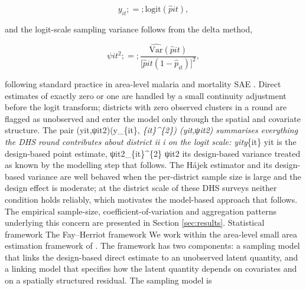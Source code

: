 \documentclass{article}
\begin{document}
\begin{equation}

y_{it} ;=; \mathrm{logit}(\hat{p}{it}),

\label{eq:logit}

\end{equation}

and the logit-scale sampling variance follows from the delta method,

\begin{equation}

\psi{it}^{2} ;=; \frac{\widehat{\mathrm{Var}}(\hat{p}{it})}{\bigl[\hat{p}{it}(1 - \hat{p}_{it})\bigr]^{2}},

\label{eq:psi}

\end{equation}

following standard practice in area-level malaria and mortality SAE
\citep{mercer2015, wakefield2020}. Direct estimates of exactly zero or
one are handled by a small continuity adjustment before the logit
transform; districts with zero observed clusters in a round are flagged
as unobserved and enter the model only through the spatial and covariate
structure. The pair (yit,ψit2)(y\_\{it\}, \psi\emph{\{it\}\^{}\{2\})
(yit\hspace{0pt},ψit2\hspace{0pt}) summarises everything the DHS round
contributes about district ii i on the logit scale: yity}\{it\}
yit\hspace{0pt} is the design-based point estimate,
ψit2\psi\_\{it\}\^{}\{2\} ψit2\hspace{0pt} its design-based variance
treated as known by the modelling step that follows. The Hájek estimator
and its design-based variance are well behaved when the per-district
sample size is large and the design effect is moderate; at the district
scale of these DHS surveys neither condition holds reliably, which
motivates the model-based approach that follows. The empirical
sample-size, coefficient-of-variation and aggregation patterns
underlying this concern are presented in Section \ref{sec:results}.
Statistical framework \label{sec:framework} The Fay--Herriot framework
\label{sec:fh} We work within the area-level small area estimation
framework of \citep{fay1979}. The framework has two components: a
sampling model that links the design-based direct estimate to an
unobserved latent quantity, and a linking model that specifies how the
latent quantity depends on covariates and on a spatially structured
residual. The sampling model is
\end{document}
